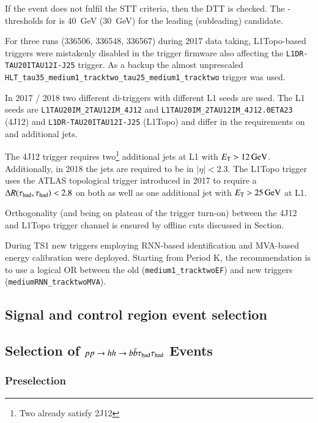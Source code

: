 If the event does not fulfil the STT criteria, then the DTT is checked. The
\pT-thresholds for \tauhadvis is \SI{40}{\GeV} (\SI{30}{\GeV}) for the leading
(subleading) \tauhadvis candidate.

For three runs (336506, 336548, 336567) during 2017 data taking, L1Topo-based
triggers were mistakenly disabled in the trigger firmware also affecting the
\verb|L1DR-TAU20ITAU12I-J25| trigger. As a backup the almost unprescaled
\verb|HLT_tau35_medium1_tracktwo_tau25_medium1_tracktwo| trigger was used.

In 2017 / 2018 two different di-\tauhad triggers with different L1 seeds are
used. The L1 seeds are \verb|L1TAU20IM_2TAU12IM_4J12| and
\verb|L1TAU20IM_2TAU12IM_4J12.0ETA23| (4J12) and \verb|L1DR-TAU20ITAU12I-J25|
(L1Topo) and differ in the requirements on \tauhadvis and additional jets.

The 4J12 trigger requires two\footnote{Two \tauhadvis already satisfy 2J12}
additional jets at L1 with $\ET > \SI{12}{\GeV}$. Additionally, in 2018 the jets
are required to be in $|\eta| < 2.3$. The L1Topo trigger uses the ATLAS
topological trigger introduced in 2017 to require a $\Delta R(\tau_{\text{had}}, \tau_{\text{had}})
< 2.8$ on both \tauhad as well as one additional jet with $E_{\text{T}} > \SI{25}{\ensuremath{\text{GeV}}}$
at L1.

Orthogonality (and being on plateau of the trigger turn-on) between the 4J12 and
L1Topo trigger channel is ensured by offline cuts discussed in
Section.%

During TS1 new \tauhadvis triggers employing RNN-based \tauhad identification
and MVA-based energy calibration were deployed. Starting from Period K, the
recommendation is to use a logical OR between the old
(\verb|medium1_tracktwoEF|) and new triggers (\verb|mediumRNN_tracktwoMVA|).


\subsection{Signal and control region event selection}%
\label{sec:sr_and_cr_selection}



\subsection{Selection of $pp \rightarrow hh \rightarrow b\bar{b}\tau_{\text{had}}\tau_{\text{had}}$ Events}
\label{sec:reconstruction_of_higgs_candidates}


\subsubsection{Preselection}

